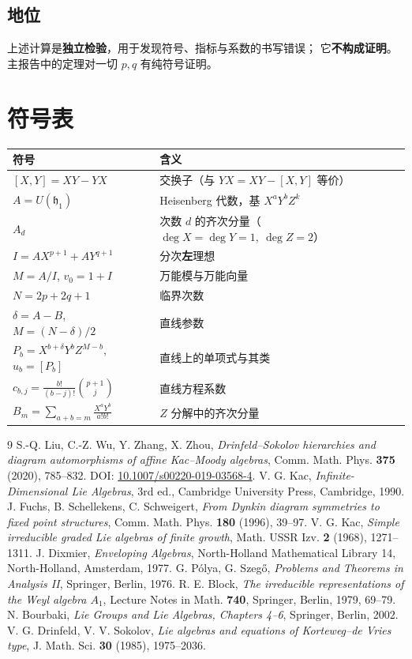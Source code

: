 \documentclass[11pt,UTF8]{ctexart}
\theoremstyle{definition}
\newcommand{\hh}{\mathfrak{h}}
\begin{document}
\subsection{地位}
上述计算是\textbf{独立检验}，用于发现符号、指标与系数的书写错误；
它\textbf{不构成证明}。主报告中的定理对一切 $p,q$ 有纯符号证明。

\section{符号表}

\begin{center}
\begin{tabular}{ll}
\toprule
符号 & 含义\\
\midrule
$[X,Y]=XY-YX$ & 交换子（与 $YX=XY-[X,Y]$ 等价）\\
$A=U(\hh_1)$ & Heisenberg 代数，基 $X^aY^bZ^k$\\
$A_d$ & 次数 $d$ 的齐次分量（$\deg X=\deg Y=1,\ \deg Z=2$）\\
$I=AX^{p+1}+AY^{q+1}$ & 分次\textbf{左}理想\\
$M=A/I$, $v_0=1+I$ & 万能模与万能向量\\
$N=2p+2q+1$ & 临界次数\\
$\delta=A-B$, $M=(N-\delta)/2$ & 直线参数\\
$P_b=X^{b+\delta}Y^bZ^{M-b}$, $u_b=[P_b]$ & 直线上的单项式与其类\\
$c_{b,j}=\frac{b!}{(b-j)!}\binom{p+1}{j}$ & 直线方程系数\\
$B_m=\sum_{a+b=m}\frac{X^aY^b}{a!b!}$ & $Z$ 分解中的齐次分量\\
\bottomrule
\end{tabular}
\end{center}

\begin{thebibliography}{9}
 S.-Q. Liu, C.-Z. Wu, Y. Zhang, X. Zhou,
\emph{Drinfeld--Sokolov hierarchies and diagram automorphisms of affine Kac--Moody algebras},
Comm. Math. Phys. \textbf{375} (2020), 785--832.
DOI: \href{https://doi.org/10.1007/s00220-019-03568-4}{10.1007/s00220-019-03568-4}.
 V. G. Kac, \emph{Infinite-Dimensional Lie Algebras}, 3rd ed.,
Cambridge University Press, Cambridge, 1990.
 J. Fuchs, B. Schellekens, C. Schweigert,
\emph{From Dynkin diagram symmetries to fixed point structures},
Comm. Math. Phys. \textbf{180} (1996), 39--97.
 V. G. Kac, \emph{Simple irreducible graded Lie algebras of finite growth},
Math. USSR Izv. \textbf{2} (1968), 1271--1311.
 J. Dixmier, \emph{Enveloping Algebras}, North-Holland Mathematical Library 14,
North-Holland, Amsterdam, 1977.
 G. P\'olya, G. Szeg\H{o}, \emph{Problems and Theorems in Analysis II},
Springer, Berlin, 1976.
 R. E. Block, \emph{The irreducible representations of the Weyl algebra $A_1$},
Lecture Notes in Math. \textbf{740}, Springer, Berlin, 1979, 69--79.
 N. Bourbaki, \emph{Lie Groups and Lie Algebras, Chapters 4--6},
Springer, Berlin, 2002.
 V. G. Drinfeld, V. V. Sokolov,
\emph{Lie algebras and equations of Korteweg--de Vries type},
J. Math. Sci. \textbf{30} (1985), 1975--2036.
\end{thebibliography}
\end{document}
